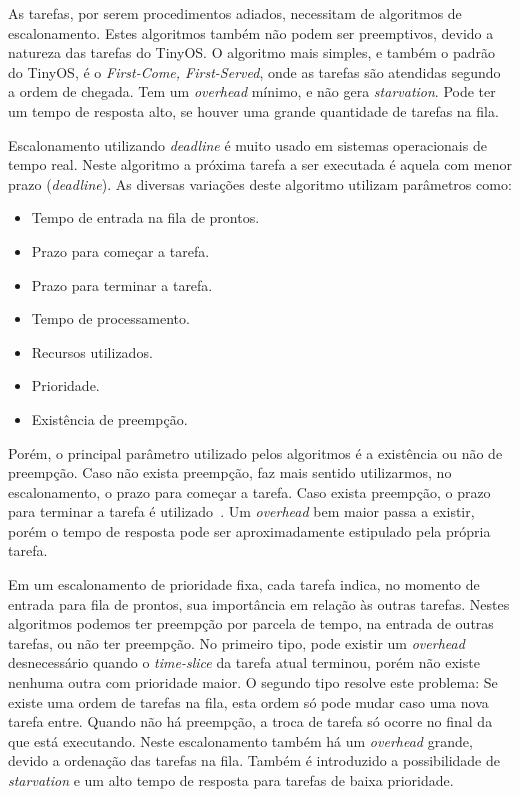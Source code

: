 As tarefas, por serem procedimentos adiados, necessitam de algoritmos de escalonamento. Estes algoritmos também não
podem ser preemptivos, devido a natureza das tarefas do TinyOS.
O algoritmo mais simples, e também o padrão do TinyOS, é o \textit{First-Come, First-Served}, onde as tarefas são
atendidas segundo a ordem de chegada. Tem um \textit{overhead} mínimo, e não gera \textit{starvation}. Pode ter um tempo de
resposta alto, se houver uma grande quantidade de tarefas na fila.

Escalonamento utilizando \textit{deadline} é muito usado em sistemas operacionais de tempo real. Neste algoritmo
a próxima tarefa a ser executada é aquela com menor prazo (\textit{deadline}). As diversas variações deste algoritmo utilizam
parâmetros como: 
\begin{itemize}
    \item Tempo de entrada na fila de prontos.
    \item Prazo para começar a tarefa.
    \item Prazo para terminar a tarefa.
    \item Tempo de processamento.
    \item Recursos utilizados.
    \item Prioridade.
    \item Existência de preempção.
\end{itemize}
Porém, o principal parâmetro utilizado pelos algoritmos é a existência ou não de preempção. Caso não exista preempção,
faz mais sentido utilizarmos, no escalonamento, o prazo para começar a tarefa. Caso exista preempção, o prazo para
terminar a tarefa é utilizado~\cite{Stallings/04}.
Um \textit{overhead} bem maior passa a existir, porém o tempo de resposta pode ser aproximadamente estipulado pela
própria tarefa.

Em um escalonamento de prioridade fixa, cada tarefa indica, no momento de entrada para fila de prontos, sua importância em relação às
outras tarefas. Nestes algoritmos podemos ter preempção por parcela de tempo, na entrada de outras tarefas, ou não ter preempção. 
No primeiro tipo, pode existir um \textit{overhead} desnecessário quando o \textit{time-slice} da tarefa atual terminou,
porém não existe nenhuma outra com prioridade maior. O segundo tipo resolve este problema: Se existe uma ordem de
tarefas na fila, esta ordem só pode mudar caso uma nova tarefa entre.
Quando não há preempção, a troca de tarefa só ocorre no final da que está executando.
Neste escalonamento também há um \textit{overhead} grande, devido a ordenação das tarefas na fila. Também é introduzido
a possibilidade de \textit{starvation} e um alto tempo de resposta para tarefas de baixa prioridade.

